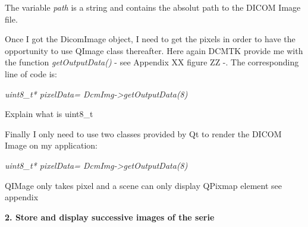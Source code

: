 The variable \textit{path} is a string and contains the absolut path to the DICOM Image file.
\newline \vspace{5mm}


Once I got the DicomImage object, I need to get the pixels in order to have the opportunity to use QImage class thereafter. Here again DCMTK provide me with the function \textit{getOutputData()} - see Appendix XX figure ZZ -. The corresponding line of code is:
\newline \vspace{5mm} 

	\begin{center}
	\textit{uint8_t* pixelData= DcmImg->getOutputData(8)}
	\end{center}

\newline \vspace{5mm}  
Explain what is uint8_t



Finally I only need to use two classes provided by Qt to render the DICOM Image on my application:

\newline \vspace{5mm} 

	\begin{center}
	\textit{uint8_t* pixelData= DcmImg->getOutputData(8)}
	\end{center}

\newline \vspace{5mm}  

QIMage only takes pixel and a scene can only display QPixmap element see appendix


\newline \vspace{5mm}	

\textbf{2. Store and display successive images of the serie}

\newline \vspace{5mm}	




